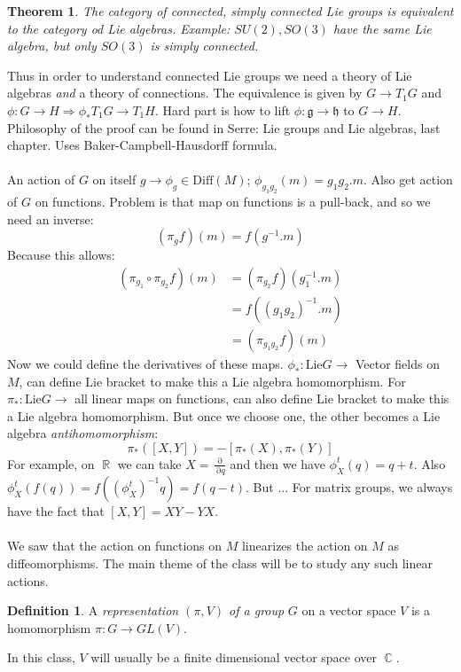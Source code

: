 \documentclass[12 pt]{article}
\DeclareMathOperator {\p} {\partial}
\DeclareMathOperator {\R} {\mathbb{R}}
\DeclareMathOperator {\C} {\mathbb{C}}
\theoremstyle{plain}
\newtheorem*{thm*}{Theorem}
\theoremstyle{definition}
\newtheorem{defn}{Definition}
\theoremstyle{remark}
\begin{document}
\begin{thm*}
 The category of connected, simply connected Lie groups is equivalent to the category od Lie algebras. Example: $SU(2), SO(3)$ have the same Lie algebra, but only $SO(3)$ is simply connected.
\end{thm*}
Thus in order to understand connected Lie groups we need a theory of Lie algebras \emph{and} a theory of connections. The equivalence is given by $G\to T_1G$ and $\phi:G\to H  \Rightarrow \phi_* T_1G \to T_1H$. Hard part is how to lift $\phi:\mathfrak{g} \to \mathfrak{h}$ to $G\to H$. Philosophy of the proof can be found in Serre: Lie groups and Lie algebras, last chapter. Uses Baker-Campbell-Hausdorff formula.
\\
\\
An action of $G$ on itself $g \to \phi_g \in \text{Diff}(M)$; $\phi_{g_1g_2} (m) = g_1 g_2 . m$. Also get action of $G$ on functions. Problem is that map on functions is a pull-back, and so we need an inverse:
\[     (\pi_g f) (m) = f(g^{-1} . m)      \]
Because this allows:
\begin{align*}
       (\pi_{g_1} \circ \pi_{g_2} f) (m) &= (\pi_{g_2} f)(g_1^{-1} . m)    \\
 &= f((g_1g_2)^{-1} .m) \\
&= (\pi_{g_1g_2} f) (m)
\end{align*}
Now we could define the derivatives of these maps. $\phi_* : \text{Lie} G \to $ Vector fields on $M$, can define Lie bracket to make this a Lie algebra homomorphism. For $\pi_* : \text{Lie} G \to $ all linear maps on functions, can also define Lie bracket to make this a Lie algebra homomorphism. But once we choose one, the other becomes a Lie algebra \emph{antihomomorphism}:
\[   \pi_*([X,Y]) = - [\pi_*(X) , \pi_*(Y)]   \]
For example, on $\R$ we can take $X = \frac{\p}{\p q}$ and then we have $\phi^t_X (q) = q+t$. Also $\phi^t_X (f(q)) = f((\phi^t_X)^{-1} q) = f(q-t)$. But ...
For matrix groups, we always have the fact that $[X,Y] = XY-YX$.
\\
\\
We saw that the action on functions on $M$ linearizes the action on $M$ as diffeomorphisms. The main theme of the class will be to study any such linear actions.
\begin{defn}
A \emph{representation $(\pi, V)$ of a group} $G$ on a vector space $V$ is a homomorphism $\pi:G \to GL(V)$.
\end{defn}
In this class, $V$ will usually be a finite dimensional vector space over $\C$.
\end{document}
